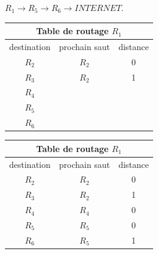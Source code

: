 \begin{enumerate}[series=monDS, resume]
\begin{minipage}[h]{0.5\textwidth}
\begin{blocvisiblex}[height=1]
{\quad}
 $R_1 \rightarrow R_5 \rightarrow R_6 \rightarrow INTERNET$.
    \end{blocvisiblex}
\end{minipage}\hfill{}
\begin{minipage}[h]{0.44\textwidth}
\begin{blocvisiblex}[height=5]
    {\centering
    \renewcommand{\arraystretch}{1.3}
    \begin{tabular}{|c|c|c|}
        \hline
        \multicolumn{3}{|c|}{\textbf{Table de routage $R_1$}} \\ \hline
        destination & prochain saut & distance \\ \hline
        $R_2$       & $R_2$         & 0        \\ \hline
        $R_3$       & $R_2$         & 1        \\ \hline
        $R_4$       &               &          \\ \hline
        $R_5$       &               &          \\ \hline
        $R_6$       &               &          \\ \hline
    \end{tabular}}
\centering
    \renewcommand{\arraystretch}{1.3}
    \begin{tabular}{|c|c|c|}
        \hline
        \multicolumn{3}{|c|}{\textbf{Table de routage $R_1$}} \\ \hline
        destination & prochain saut & distance \\ \hline
        $R_2$       & $R_2$         & 0        \\ \hline
        $R_3$       & $R_2$         & 1        \\ \hline
        $R_4$       & $R_4$         & 0        \\ \hline
        $R_5$       & $R_5$         & 0        \\ \hline
        $R_6$       & $R_5$         & 1        \\ \hline
        
    \end{tabular}
\end{blocvisiblex}
    
\end{minipage}
 \end{enumerate}

 \medskip



\smallskip

